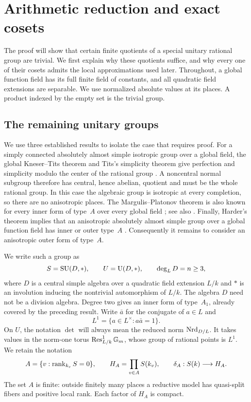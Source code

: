 \section{Arithmetic reduction and exact cosets}\label{sec:arithmetic}

The proof will show that certain finite quotients of a special unitary
rational group are trivial.  We first explain why these quotients suffice,
and why every one of their cosets admits the local approximations used
later.  Throughout, a global function field has its full finite field of
constants, and all quadratic field extensions are separable.  We use
normalized absolute values at its places.  A product indexed by the empty
set is the trivial group.

\subsection{The remaining unitary groups}

We use three established results to isolate the case that requires proof.
For a simply connected absolutely almost simple isotropic group over a
global field, the global Kneser--Tits theorem and Tits's simplicity theorem
give perfection and simplicity modulo the center of the rational group
\cite[Theorem~8.1]{Gille}\cite{Tits}.  A noncentral normal subgroup
therefore has central, hence abelian, quotient and must be the whole
rational group.  In this case the algebraic group is isotropic
at every completion, so there are no anisotropic places.  The
Margulis--Platonov theorem is also known for every inner form of type~$A$
over every global field
\cite[Theorem~6.4]{RapinchukSegevSeitz2002}; see also
\cite[Proposition~1]{Rapinchuk2006}.  Finally, Harder's theorem implies
that an anisotropic absolutely almost simple group over a global function
field has inner or outer type~$A$
\cite{Harder}\cite[p.~914]{PrasadTriality}.
Consequently it remains to consider an anisotropic outer form of type~$A$.

We write such a group as
\begin{equation}\label{arith:unitary-notation}
 S=\operatorname{SU}(D,*),\qquad U=\operatorname{U}(D,*),\qquad \deg_L D=n\geq 3,
\end{equation}
where $D$ is a central simple algebra over a quadratic field extension
$L/k$ and $*$ is an involution inducing the nontrivial automorphism of
$L/k$.  The algebra $D$ need not be a division algebra.  Degree two gives
an inner form of type~$A_1$, already covered by the preceding result.
Write $\bar a$ for the conjugate of $a\in L$ and
\[
 L^1=\{a\in L^\times:a\bar a=1\}.
\]
On $U$, the notation $\det$ will always mean the reduced norm
$\operatorname{Nrd}_{D/L}$.  It takes values in the norm-one torus
$\operatorname{Res}^1_{L/k}\mathbb G_m$, whose group of rational points is $L^1$.
We retain the notation
\[
 A=\{v:\operatorname{rank}_{k_v}S=0\},\qquad
 H_A=\prod_{v\in A}S(k_v),\qquad
 \delta_A:S(k)\longrightarrow H_A.
\]
The set $A$ is finite: outside finitely many places a reductive model has
quasi-split fibers and positive local rank.  Each factor of $H_A$ is
compact.

